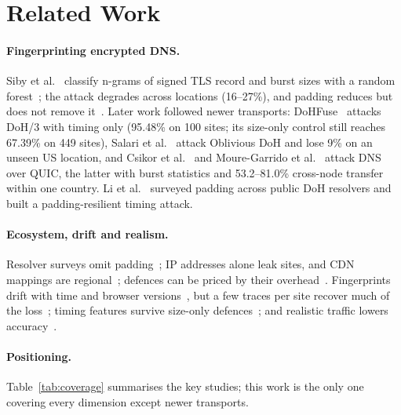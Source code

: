 \documentclass[pdflatex,sn-mathphys-num]{sn-jnl}
\begin{document}
\section{Related Work}\label{sec:related}

\paragraph{Fingerprinting encrypted DNS.} Siby et al.~\cite{siby2020} classify n-grams of signed TLS record and burst sizes with a random forest~\cite{breiman2001rf}; the attack degrades across locations (16--27\%), and padding reduces but does not remove it~\cite{bushart2020}. Later work followed newer transports: DoHFuse~\cite{zhang2026dohfuse} attacks DoH/3 with timing only (95.48\% on 100 sites; its size-only control still reaches 67.39\% on 449 sites), Salari et al.~\cite{salari2025odoh} attack Oblivious DoH and lose 9\% on an unseen US location, and Csikor et al.~\cite{csikor2025} and Moure-Garrido et al.~\cite{mouregarrido2026} attack DNS over QUIC, the latter with burst statistics and 53.2--81.0\% cross-node transfer within one country. Li et al.~\cite{li2025unraveling} surveyed padding across public DoH resolvers and built a padding-resilient timing attack.

\paragraph{Ecosystem, drift and realism.} Resolver surveys omit padding~\cite{bielefeld2026}; IP addresses alone leak sites, and CDN mappings are regional~\cite{ahmad2026ipv6}; defences can be priced by their overhead~\cite{jimenez2025forgery}. Fingerprints drift with time and browser versions~\cite{shusterman2026}, but a few traces per site recover much of the loss~\cite{zhao2026traverse}; timing features survive size-only defences~\cite{gong2026wfcat}; and realistic traffic lowers accuracy~\cite{deng2026,jansen2026gtt23}.

\paragraph{Positioning.} Table~\ref{tab:coverage} summarises the key studies; this work is the only one covering every dimension except newer transports.
\end{document}
